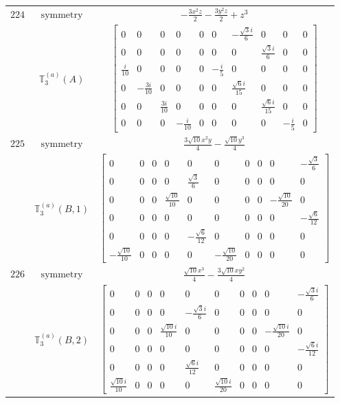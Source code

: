 \documentclass[fleqn,8pt,landscape]{jsarticle}
\begin{document}
\begin{longtable}{ccc}
$ 224 $ & $ \text{symmetry} $ & $ - \frac{3 x^{2} z}{2} - \frac{3 y^{2} z}{2} + z^{3} $ \\
$  $ & $ \mathbb{T}_{3}^{(a)}(A) $ & $ \begin{bmatrix} 0 & 0 & 0 & 0 & 0 & 0 & - \frac{\sqrt{3} i}{6} & 0 & 0 & 0 \\ 0 & 0 & 0 & 0 & 0 & 0 & 0 & \frac{\sqrt{3} i}{6} & 0 & 0 \\ \frac{i}{10} & 0 & 0 & 0 & 0 & - \frac{i}{5} & 0 & 0 & 0 & 0 \\ 0 & - \frac{3 i}{10} & 0 & 0 & 0 & 0 & \frac{\sqrt{6} i}{15} & 0 & 0 & 0 \\ 0 & 0 & \frac{3 i}{10} & 0 & 0 & 0 & 0 & \frac{\sqrt{6} i}{15} & 0 & 0 \\ 0 & 0 & 0 & - \frac{i}{10} & 0 & 0 & 0 & 0 & - \frac{i}{5} & 0 \end{bmatrix} $ \\ \hline
$ 225 $ & $ \text{symmetry} $ & $ \frac{3 \sqrt{10} x^{2} y}{4} - \frac{\sqrt{10} y^{3}}{4} $ \\
$  $ & $ \mathbb{T}_{3}^{(a)}(B,1) $ & $ \begin{bmatrix} 0 & 0 & 0 & 0 & 0 & 0 & 0 & 0 & 0 & - \frac{\sqrt{3}}{6} \\ 0 & 0 & 0 & 0 & \frac{\sqrt{3}}{6} & 0 & 0 & 0 & 0 & 0 \\ 0 & 0 & 0 & \frac{\sqrt{10}}{10} & 0 & 0 & 0 & 0 & - \frac{\sqrt{10}}{20} & 0 \\ 0 & 0 & 0 & 0 & 0 & 0 & 0 & 0 & 0 & - \frac{\sqrt{6}}{12} \\ 0 & 0 & 0 & 0 & - \frac{\sqrt{6}}{12} & 0 & 0 & 0 & 0 & 0 \\ - \frac{\sqrt{10}}{10} & 0 & 0 & 0 & 0 & - \frac{\sqrt{10}}{20} & 0 & 0 & 0 & 0 \end{bmatrix} $ \\ \hline
$ 226 $ & $ \text{symmetry} $ & $ \frac{\sqrt{10} x^{3}}{4} - \frac{3 \sqrt{10} x y^{2}}{4} $ \\
$  $ & $ \mathbb{T}_{3}^{(a)}(B,2) $ & $ \begin{bmatrix} 0 & 0 & 0 & 0 & 0 & 0 & 0 & 0 & 0 & - \frac{\sqrt{3} i}{6} \\ 0 & 0 & 0 & 0 & - \frac{\sqrt{3} i}{6} & 0 & 0 & 0 & 0 & 0 \\ 0 & 0 & 0 & \frac{\sqrt{10} i}{10} & 0 & 0 & 0 & 0 & - \frac{\sqrt{10} i}{20} & 0 \\ 0 & 0 & 0 & 0 & 0 & 0 & 0 & 0 & 0 & - \frac{\sqrt{6} i}{12} \\ 0 & 0 & 0 & 0 & \frac{\sqrt{6} i}{12} & 0 & 0 & 0 & 0 & 0 \\ \frac{\sqrt{10} i}{10} & 0 & 0 & 0 & 0 & \frac{\sqrt{10} i}{20} & 0 & 0 & 0 & 0 \end{bmatrix} $ \\ \hline

\end{longtable}
\end{document}
